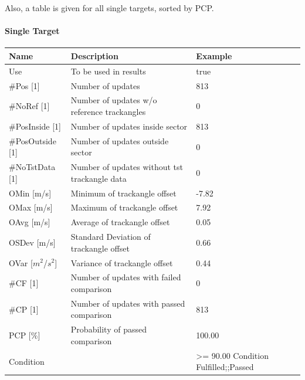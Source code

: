 Also, a table is given for all single targets, sorted by PCP.

\paragraph{Single Target}

\begin{center}
 \begin{table}[H]
  \begin{tabularx}{\textwidth}{ | l | X |  l | }
    \hline
    \textbf{Name} & \textbf{Description} & \textbf{Example} \\ \hline
    Use & To be used in results & true \\ \hline
    \#Pos [1] & Number of updates & 813 \\ \hline
    \#NoRef [1] & Number of updates w/o reference trackangles & 0 \\ \hline
    \#PosInside [1] & Number of updates inside sector & 813 \\ \hline
    \#PosOutside [1] & Number of updates outside sector & 0 \\ \hline
    \#NoTstData [1] & Number of updates without tst trackangle data & 0 \\ \hline
    OMin [m/s] & Minimum of trackangle offset & -7.82 \\ \hline
    OMax [m/s] & Maximum of trackangle offset & 7.92 \\ \hline
    OAvg [m/s] & Average of trackangle offset & 0.05 \\ \hline
    OSDev [m/s] & Standard Deviation of trackangle offset & 0.66 \\ \hline
    OVar [$m^2$/$s^2$] & Variance of trackangle offset & 0.44 \\ \hline
    \#CF [1] & Number of updates with failed comparison & 0 \\ \hline
    \#CP [1] & Number of updates with passed comparison & 813 \\ \hline
    PCP [\%] & Probability of passed comparison & 100.00 \\ \hline
    Condition &  & >= 90.00
    Condition Fulfilled;;Passed
\end{tabularx}
\end{table}
\end{center}

